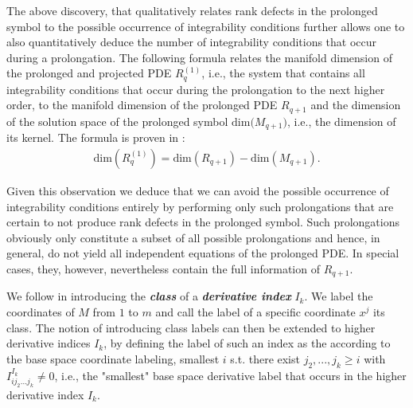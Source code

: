 The above discovery, that qualitatively relates rank defects in the prolonged symbol to the possible occurrence of integrability conditions further allows one  to also quantitatively deduce the number of integrability conditions that occur during a prolongation.
The following formula relates the manifold dimension of the prolonged and projected PDE $R_q^{(1)}$, i.e., the system that contains all integrability conditions that occur during the prolongation to the next higher order, to the manifold dimension of the prolonged PDE $R_{q+1}$ and the dimension of the solution space of the prolonged symbol $\mathrm{dim(}M_{q+1})$, i.e., the dimension of its kernel. The formula is proven in \cite{seiler1994analysis}:
\begin{align}
    \mathrm{dim}(R_{q}^{(1)}) = \mathrm{dim}(R_{q+1}) - \mathrm{dim}(M_{q+1}).
\end{align}

Given this observation we deduce that we can avoid the possible occurrence of integrability conditions entirely by performing only such prolongations that are certain to not produce rank defects in the prolonged symbol. Such prolongations obviously only constitute a subset of all possible prolongations and hence, in general, do not yield all independent equations of the prolonged PDE. In special cases, they, however, nevertheless contain the full information of $R_{q+1}$.

We follow \cite{seiler1994analysis} in introducing the \textit{\textbf{class}} of a \textit{\textbf{derivative index}} $I_k$. We label the coordinates of $M$ from $1$ to $m$ and call the label of a specific coordinate $x^j$ its class. The notion of introducing class labels can then be extended to higher derivative indices $I_k$, by defining the label of such an index as the according to the base space coordinate labeling, smallest $i$ s.t. there exist $j_2,...,j_k\geq i$ with $I^{I_k}_{ij_2...j_k} \neq 0$, i.e., the "smallest" base space derivative label that occurs in the higher derivative index $I_k$.

